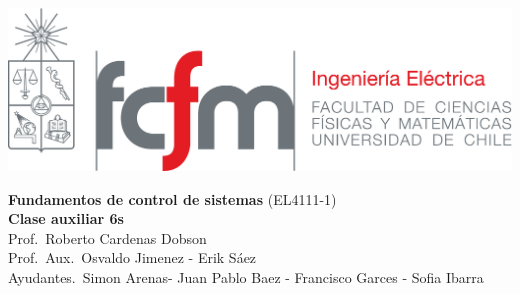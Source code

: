 \documentclass[
  11pt,
  letterpaper,
   addpoints,
   answers
  ]{exam}
\begin{document}
\noindent
\begin{minipage}{0.47\textwidth}
\includegraphics[width=\textwidth]{../fcfm_die}
\end{minipage}
\begin{minipage}{0.53\textwidth}
\begin{center} 
\large\textbf{Fundamentos de control de sistemas} (EL4111-1) \\
\large\textbf{Clase auxiliar 6s} \\
\small Prof.~Roberto Cardenas Dobson\\
\small Prof.~Aux.~Osvaldo Jimenez - Erik Sáez\\
\small Ayudantes.~Simon Arenas- Juan Pablo Baez - Francisco Garces - Sofia Ibarra\\
\end{center}
\end{minipage}

\vspace{0.5cm}
\noindent
\vspace{.85cm}
\end{document}
